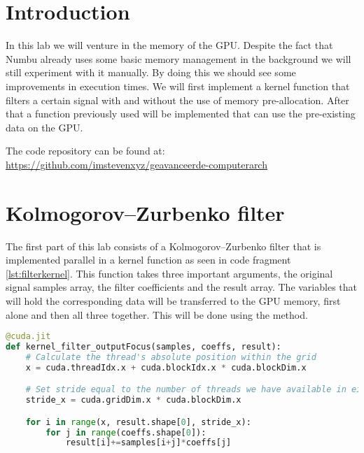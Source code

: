 
\section{Introduction}
\label{sec:introduction}
 
In this lab we will venture in the memory of the GPU. Despite the fact that Numbu already uses some basic memory management in the background we will still experiment with it manually. By doing this we should see some improvements in execution times. We will first implement a kernel function that filters a certain signal with and without the use of memory pre-allocation. After that a function previously used will be implemented that can use the pre-existing data on the GPU.

The code repository can be found at: \\
\url{https://github.com/imstevenxyz/geavanceerde-computerarch}

\newpage

\section{Kolmogorov–Zurbenko filter}
\label{sec:Kolmogorov–Zurbenko filter}

The first part of this lab consists of a Kolmogorov–Zurbenko filter that is implemented parallel in a kernel function as seen in code fragment \ref{lst:filterkernel}. This function takes three important arguments, the original signal samples array, the filter coefficients and the result array. The variables that will hold the corresponding data will be transferred to the GPU memory, first alone and then all three together. This will be done using the  method.

\begin{lstlisting}[language=Python,caption={KZ-filter kernel function},label={lst:filterkernel}]
@cuda.jit
def kernel_filter_outputFocus(samples, coeffs, result):
    # Calculate the thread's absolute position within the grid
    x = cuda.threadIdx.x + cuda.blockIdx.x * cuda.blockDim.x

    # Set stride equal to the number of threads we have available in either direction
    stride_x = cuda.gridDim.x * cuda.blockDim.x

    for i in range(x, result.shape[0], stride_x):
        for j in range(coeffs.shape[0]):
            result[i]+=samples[i+j]*coeffs[j]
\end{lstlisting}


